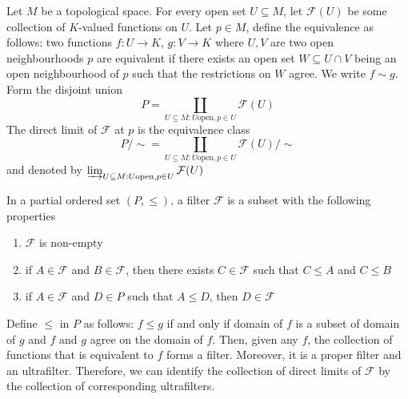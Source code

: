 \begin{definition}
	Let $M$ be a topological space. For every open set $U \subseteq M$, let $\mathcal{F}(U)$ be some collection of $K$-valued functions on $U$. Let $p \in M$, define the equivalence as follows: two functions $f: U \to K$, $g: V \to K$ where $U, V$ are two open neighbourhoods $p$ are equivalent if there exists an open set $W \subseteq U \cap V$ being an open neighbourhood of $p$ such that the restrictions on $W$ agree. We write $f \sim g$. Form the disjoint union
	$$
	P = \coprod_{U \subseteq M: U \text{open}, p \in U} \mathcal{F}(U)
	$$
	The direct limit of $\mathcal{F}$ at $p$ is the equivalence class
	$$
	P / \sim = \coprod_{U \subseteq M: U \text{open}, p \in U} \mathcal{F}(U) / \sim
	$$
	and denoted by $\varinjlim_{U \subseteq M: U \text{open}, p \in U} \mathcal{F}(U)$
	
\end{definition}

\begin{remark}
	In a partial ordered set $(P, \leq)$, a filter $\mathcal{F}$ is a subset with the following properties
	\begin{enumerate}
		\item $\mathcal{F}$ is non-empty
		\item if $A \in \mathcal{F}$ and $B \in \mathcal{F}$, then there exists $C \in \mathcal{F}$ such that $C \leq A$ and $C \leq B$
		\item if $A \in \mathcal{F}$ and $D \in P$ such that $A \leq D$, then $D \in \mathcal{F}$
	\end{enumerate}
	Define $\leq$ in $P$ as follows: $f \leq g$ if and only if domain of $f$ is a subset of domain of $g$ and $f$ and $g$ agree on the domain of $f$. Then, given any $f$, the collection of functions that is equivalent to $f$ forms a filter. Moreover, it is a proper filter and an ultrafilter. Therefore, we can identify the collection of direct limits of $\mathcal{F}$ by the collection of corresponding ultrafilters.
\end{remark}

